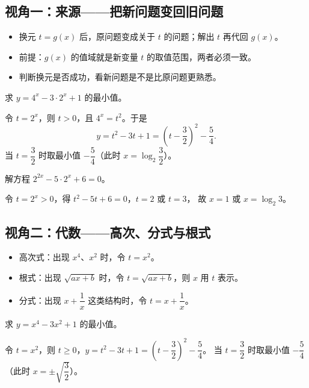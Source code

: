 \begin{explore}

\subsection{视角一：来源——把新问题变回旧问题}

\begin{itemize}
  \item 换元 $t=g(x)$ 后，原问题变成关于 $t$ 的问题；解出 $t$ 再代回 $g(x)$。
  \item 前提：$g(x)$ 的值域就是新变量 $t$ 的取值范围，两者必须一致。
  \item 判断换元是否成功，看新问题是不是比原问题更熟悉。
\end{itemize}

\begin{example}
求 $y=4^x-3\cdot2^x+1$ 的最小值。
\end{example}
\begin{solution}
令 $t=2^x$，则 $t>0$，且 $4^x=t^2$。于是
\[
  y=t^2-3t+1=\left(t-\frac32\right)^2-\frac54.
\]
当 $t=\dfrac32$ 时取最小值 $-\dfrac54$（此时 $x=\log_2\dfrac32$）。
\end{solution}

\begin{problem}
解方程 $2^{2x}-5\cdot2^x+6=0$。
\end{problem}
\begin{solution}
令 $t=2^x>0$，得 $t^2-5t+6=0$，$t=2$ 或 $t=3$，
故 $x=1$ 或 $x=\log_2 3$。
\end{solution}

\subsection{视角二：代数——高次、分式与根式}

\begin{itemize}
  \item 高次式：出现 $x^4$、$x^2$ 时，令 $t=x^2$。
  \item 根式：出现 $\sqrt{ax+b}$ 时，令 $t=\sqrt{ax+b}$，则 $x$ 用 $t$ 表示。
  \item 分式：出现 $x+\dfrac1x$ 这类结构时，令 $t=x+\dfrac1x$。
\end{itemize}

\begin{example}
求 $y=x^4-3x^2+1$ 的最小值。
\end{example}
\begin{solution}
令 $t=x^2$，则 $t\geq0$，$y=t^2-3t+1=\left(t-\dfrac32\right)^2-\dfrac54$。
当 $t=\dfrac32$ 时取最小值 $-\dfrac54$（此时 $x=\pm\sqrt{\dfrac32}$）。
\end{solution}


\end{explore}
